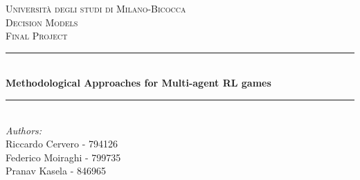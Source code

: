\begin{titlepage}

\newcommand{\HRule}{\rule{\linewidth}{0.5mm}} %

\center %
 

\textsc{\LARGE Università degli studi di Milano-Bicocca}\\[1cm] %
\textsc{\Large Decision Models}\\[0.3cm] %
\textsc{\large Final Project}\\[0.1cm] %


\HRule \\[0.4cm]
{ \huge \bfseries Methodological Approaches for Multi-agent RL games}\\[0.4cm] %
\HRule \\[1.5cm]
 

\large
\emph{Authors:}\\
Riccardo Cervero - 794126\\   %
Federico Moiraghi - 799735\\ %
Pranav Kasela - 846965\\[1cm] %




\end{titlepage}
